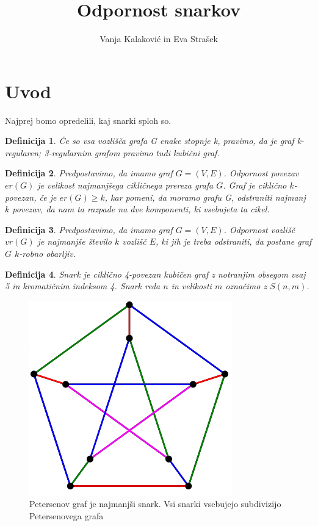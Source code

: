 \documentclass[a4paper, 10pt]{article}
\begin{document}
\newtheorem{example}{Zgled}
\newtheorem{theorem}{Izrek}
\newtheorem{proof}{Dokaz}
\newtheorem{definition}{Definicija}
\newtheorem{lemma}{Lema}



\title{Odpornost snarkov}
\author{Vanja Kalaković in Eva Strašek}
\maketitle

\pagebreak

\section{Uvod}

Najprej bomo opredelili, kaj snarki sploh so.

\begin{definition}
    Če so vsa vozlišča grafa G enake stopnje k, pravimo, da je graf
k-regularen; 3-regularnim grafom pravimo tudi kubični graf.
\end{definition}

\begin{definition}
    Predpostavimo, da imamo graf $G = (V,E)$. Odpornost povezav $er(G)$ je velikost najmanjšega
    cikličnega prereza grafa $G$. Graf je ciklično $k$-povezan, če je $er(G) \ge k$, kar 
    pomeni, da moramo grafu G, odstraniti najmanj $k$ povezav, da nam ta razpade na dve 
    komponenti, ki vsebujeta ta cikel.
\end{definition}

\begin{definition}
    Predpostavimo, da imamo graf $G = (V,E)$. Odpornost vozlišč $vr(G)$ je najmanjše število $k$
    vozlišč $E$, ki jih je treba odstraniti, da postane graf $G$ $k$-robno obarljiv.
\end{definition}

\begin{definition}
    Snark je ciklično 4-povezan kubičen graf z notranjim obsegom vsaj 5 in 
    kromatičnim indeksom 4. Snark reda $n$ in velikosti $m$ označimo z $S(n,m)$.
\end{definition}

\begin{figure}[h]
    \centering
    \includegraphics[scale=0.5]{Petersenov_graf1}
    \caption{Petersenov graf je najmanjši snark. Vsi snarki vsebujejo subdivizijo Petersenovega grafa}
\end{figure}
\end{document}
